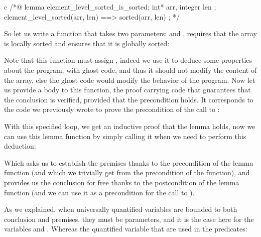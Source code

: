 \begin{CodeBlock}{c}
/*@
  lemma element_level_sorted_is_sorted:
    \forall int* arr, integer len ;
       element_level_sorted(arr, len) ==> sorted(arr, len) ;
*/
\end{CodeBlock}


So let us write a function that takes two parameters:  and
, requires that the array is locally sorted and ensures that it
is globally sorted:






Note that this function must assign , indeed
we use it to deduce some properties about the program, with ghost code, and
thus it should not modify the content of the array, else the ghost code would
modify the behavior of the program. Now let us provide a body to this function,
the proof carrying code that guarantees that the conclusion is verified, provided
that the precondition holds. It corresponds to the code we previously wrote to
prove the precondition of the call to :






With this specified loop, we get an inductive proof that the lemma holds,
now we can use this lemma function by simply calling it when we need
to perform this deduction:






Which asks us to establish the premises thanks to the precondition of the lemma
function (and which we trivially get from the precondition of the
 function), and provides us the conclusion for free
thanks to the postcondition of the lemma function (and we can use it as a
precondition for the call to ).



As we explained, when universally quantified variables are bounded to both
conclusion and premises, they must be parameters, and it is the case here for
the variables  and . Whereas the quantified
variable that are used in the predicates:



